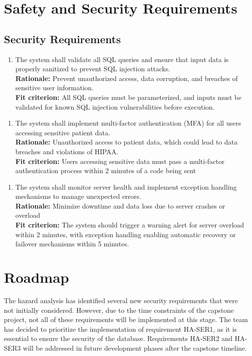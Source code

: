 \documentclass{article}
\begin{document}
\section{Safety and Security Requirements}
\subsection{Security Requirements}
\begin{enumerate}[{HA-SER}1. ]
    \item The system shall validate all SQL queries and ensure that input data is properly sanitized to prevent SQL injection attacks.\\
    \textbf{Rationale: }Prevent unauthorized access, data corruption, and breaches of sensitive user information.\\
    \textbf{Fit criterion: }All SQL queries must be parameterized, and inputs must be validated for known SQL injection vulnerabilities before execution.\\ 
  \end{enumerate}
\begin{enumerate}[{HA-SER}2. ]
    \item The system shall implement multi-factor authentication (MFA) for all users accessing sensitive patient data.\\
    \textbf{Rationale: }Unauthorized access to patient data, which could lead to data breaches and violations of HIPAA.\\
    \textbf{Fit criterion: } Users accessing sensitive data must pass a multi-factor authentication process within 2 minutes of a code being sent\\
  \end{enumerate}
\begin{enumerate}[{HA-SER}3. ]
    \item The system shall monitor server health and implement exception handling mechanisms to manage unexpected errors.\\
    \textbf{Rationale: }Minimize downtime and data loss due to server crashes or overload\\
    \textbf{Fit criterion: }The system should trigger a warning alert for server overload within 2 minutes, with exception handling enabling automatic recovery or failover mechanisms within 5 minutes.\\
  \end{enumerate}
\section{Roadmap}
The hazard analysis has identified several new security requirements that were 
not initially considered. However, due to the time constraints of the capstone 
project, not all of these requirements will be implemented at this stage. The 
team has decided to prioritize the implementation of requirement HA-SER1, as it
is essential to ensure the security of the database. Requirements HA-SER2 and
HA-SER3 will be addressed in future development phases after the capstone timeline.
\newpage
\end{document}
